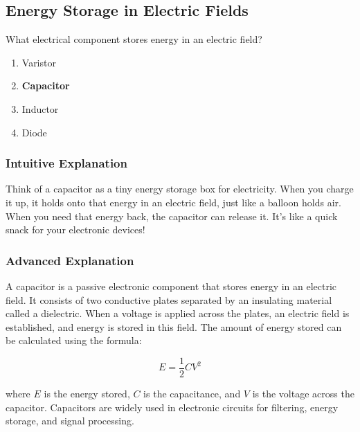 \subsection{Energy Storage in Electric Fields}
\label{T6A04}

\begin{tcolorbox}[colback=gray!10!white,colframe=black!75!black,title=T6A04]
What electrical component stores energy in an electric field?
\begin{enumerate}[noitemsep]
    \item Varistor
    \item \textbf{Capacitor}
    \item Inductor
    \item Diode
\end{enumerate}
\end{tcolorbox}

\subsubsection*{Intuitive Explanation}
Think of a capacitor as a tiny energy storage box for electricity. When you charge it up, it holds onto that energy in an electric field, just like a balloon holds air. When you need that energy back, the capacitor can release it. It's like a quick snack for your electronic devices!

\subsubsection*{Advanced Explanation}
A capacitor is a passive electronic component that stores energy in an electric field. It consists of two conductive plates separated by an insulating material called a dielectric. When a voltage is applied across the plates, an electric field is established, and energy is stored in this field. The amount of energy stored can be calculated using the formula:

\[
E = \frac{1}{2}CV^2
\]

where \(E\) is the energy stored, \(C\) is the capacitance, and \(V\) is the voltage across the capacitor. Capacitors are widely used in electronic circuits for filtering, energy storage, and signal processing.
